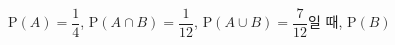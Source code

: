 $\mathrm{P}(A)=\dfrac{1}{4}$, $\mathrm{P}(A\cap B)=\dfrac{1}{12}$, $\mathrm{P}(A\cup B)=\dfrac{7}{12}$일 때, $\mathrm{P}(B)$
